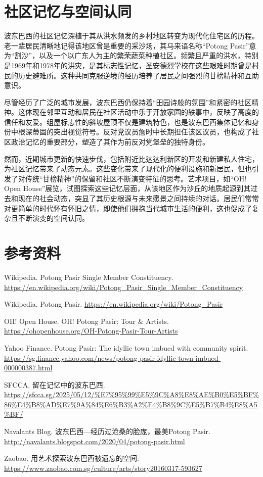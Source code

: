 \documentclass[11pt,a4paper,twoside,openany]{book}
\begin{document}
\section{社区记忆与空间认同}
波东巴西的社区记忆深植于其从洪水频发的乡村地区转变为现代化住宅区的历程。老一辈居民清晰地记得该地区曾是重要的采沙场，其马来语名称“Potong Pasir”意为“割沙”，以及一个以广东人为主的繁荣蔬菜种植社区。频繁且严重的洪水，特别是1969年和1978年的洪灾，是其标志性记忆，圣安德烈学校在这些艰难时期曾是村民的历史避难所。这种共同克服逆境的经历培养了居民之间强烈的甘榜精神和互助意识。

尽管经历了广泛的城市发展，波东巴西仍保持着“田园诗般的氛围”和紧密的社区精神。这体现在邻里互动和居民在社区活动中乐于开放家园的轶事中，反映了高度的信任和友爱。组屋标志性的斜坡屋顶不仅是建筑特色，也是波东巴西集体记忆和身份中根深蒂固的突出视觉符号。反对党议员詹时中长期担任该区议员，也构成了社区政治记忆的重要部分，塑造了其作为前反对党堡垒的独特身份。

然而，近期城市更新的快速步伐，包括附近比达达利新区的开发和新建私人住宅，为社区记忆带来了动态元素。这些变化带来了现代化的便利设施和新居民，但也引发了对传统“甘榜精神”的保留和社区不断演变特征的思考。艺术项目，如“OH! Open House”展览，试图探索这些记忆层面，从该地区作为沙丘的地质起源到其过去和现在的社会动态，突显了其历史根源与未来愿景之间持续的对话。居民们常常对更简单的时代怀有怀旧之情，即使他们拥抱当代城市生活的便利，这也促成了复杂且不断演变的空间认同。

\section*{参考资料}
\begin{enumerate}[label={[\arabic*]},leftmargin=*,topsep=2pt,itemsep=1pt,parsep=0pt]
  \item Wikipedia. Potong Pasir Single Member Constituency. \url{https://en.wikipedia.org/wiki/Potong_Pasir_Single_Member_Constituency}
  \item Wikipedia. Potong Pasir. \url{https://en.wikipedia.org/wiki/Potong_Pasir}
  \item OH! Open House. OH! Potong Pasir: Tour \& Artists. \url{https://ohopenhouse.org/OH-Potong-Pasir-Tour-Artists}
  \item Yahoo Finance. Potong Pasir: The idyllic town imbued with community spirit. \url{https://sg.finance.yahoo.com/news/potong-pasir-idyllic-town-imbued-000000387.html}
  \item SFCCA. 留在记忆中的波东巴西. \url{https://sfcca.sg/2025/05/12/%E7%95%99%E5%9C%A8%E8%AE%B0%E5%BF%86%E4%B8%AD%E7%9A%84%E6%B3%A2%E4%B8%9C%E5%B7%B4%E8%A5%BF/}
  \item Navalants Blog. 波东巴西---经历过沧桑的脸庞，最美Potong Pasir. \url{http://navalants.blogspot.com/2020/04/potong-pasir.html}
  \item Zaobao. 用艺术探索波东巴西被遗忘的空间. \url{https://www.zaobao.com.sg/culture/arts/story20160317-593627}
\end{enumerate}
\end{document}
